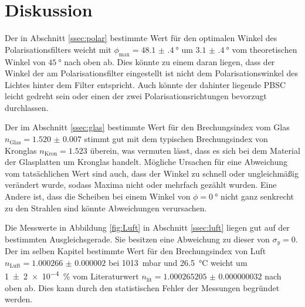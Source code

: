 
\section{Diskussion}
\label{sec:Diskussion}
Der in Abschnitt \ref{ssec:polar} bestimmte Wert für den optimalen Winkel des Polarisationsfilters weicht mit $\phi_\text{max}=\SI{48.1(4)}{\degree}$ um $\SI{3.1(4)}{\degree}$ vom theoretischen Winkel von $\SI{45}{\degree}$ nach oben ab. Dies könnte zu einem daran liegen, dass der Winkel der am Polarisationsfilter eingestellt ist nicht dem Polarisationswinkel des Lichtes hinter dem Filter entspricht. Auch könnte der dahinter liegende PBSC leicht gedreht sein oder einen der zwei Polarisationsrichtungen bevorzugt durchlassen.

Der im Abschnitt \ref{ssec:glas} bestimmte Wert für den Brechungsindex vom Glas $n_\text{Glas}=\num{1.520(7)}$ stimmt gut mit dem typischen Brechungsindex von Kronglas $n_\text{Kron}=\num{1.523}$ \cite{nKron} überein, was vermuten lässt, dass es sich bei dem Material der Glasplatten um Kronglas handelt. Mögliche Ursachen für eine Abweichung vom tatsächlichen Wert sind auch, dass der Winkel zu schnell oder ungleichmäßig verändert wurde, sodass Maxima nicht oder mehrfach gezählt wurden. Eine Andere ist, dass die Scheiben bei einem Winkel von $\phi=\SI{0}{\degree}$ nicht ganz senkrecht zu den Strahlen sind könnte Abweichungen verursachen.

Die Messwerte in Abbildung \ref{fig:Luft} in Abschnitt \ref{ssec:luft} liegen gut auf der bestimmten Ausgleichsgerade. Sie besitzen eine Abweichung zu dieser von $\sigma_y=\num{0}$. Der im selben Kapitel bestimmte Wert für den Brechungsindex von Luft $n_\text{Luft}=\num{1.000266(2)}$ bei \SI{1013}{\milli\bar} und \SI{26.5}{\degreeCelsius} weicht um \SI{1(2)e-4}{\percent} vom Literaturwert $n_\text{lit}=\num{1.000265205(32)}$ \cite{nist} nach oben ab. Dies kann durch den statistischen Fehler der Messungen begründet werden.



